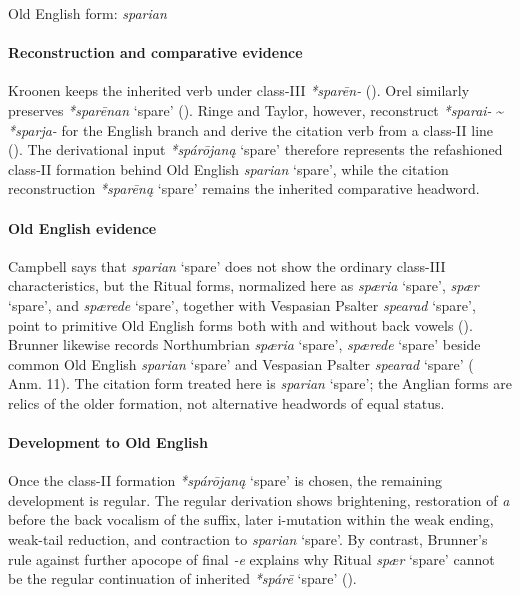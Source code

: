 \documentclass[
  british,
  a4paper,
]{article}
\providecommand{\Recon}[1]{\emph{*#1}}
\begin{document}
Old English form: \emph{sparian}

\paragraph{Reconstruction and comparative
evidence}\label{reconstruction-and-comparative-evidence-104}

Kroonen keeps the inherited verb under class-III {\emph{*sparēn-}}
(). Orel similarly
preserves \Recon{sparēnan} `spare' (). Ringe and Taylor, however, reconstruct \Recon{sparai-}
\textasciitilde{} \Recon{sparja-} for the English branch and derive the
citation verb from a class-II line (). The derivational input \Recon{spárōjaną}
`spare' therefore represents the refashioned class-II formation behind
Old English {\emph{sparian}} `spare', while the citation reconstruction
\Recon{sparēną} `spare' remains the inherited comparative headword.

\paragraph{Old English evidence}\label{old-english-evidence-104}

Campbell says that {\emph{sparian}} `spare' does not show the ordinary
class-III characteristics, but the Ritual forms, normalized here as
{\emph{spæria}} `spare', {\emph{spær}} `spare', and {\emph{spærede}}
`spare', together with Vespasian Psalter {\emph{spearad}} `spare', point
to primitive Old English forms both with and without back vowels
(). Brunner
likewise records Northumbrian {\emph{spæria}} `spare', {\emph{spærede}}
`spare' beside common Old English {\emph{sparian}} `spare' and Vespasian
Psalter {\emph{spearad}} `spare'
( Anm. 11).
The citation form treated here is {\emph{sparian}} `spare'; the Anglian
forms are relics of the older formation, not alternative headwords of
equal status.

\paragraph{Development to Old
English}\label{development-to-old-english-104}

Once the class-II formation \Recon{spárōjaną} `spare' is chosen, the
remaining development is regular. The regular derivation shows
brightening, restoration of \emph{a} before the back vocalism of the
suffix, later i-mutation within the weak ending, weak-tail reduction,
and contraction to {\emph{sparian}} `spare'. By contrast, Brunner's rule
against further apocope of final \emph{-e} explains why Ritual
{\emph{spær}} `spare' cannot be the regular continuation of inherited
\Recon{spárē} `spare' ().
\end{document}
